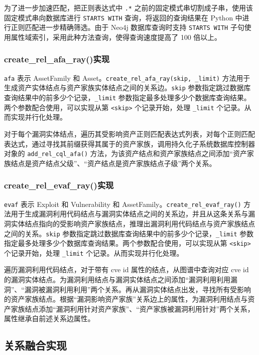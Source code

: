 \documentclass[a4paper,AutoFakeBold,oneside,12pt]{book}
\begin{document}
为了进一步加速匹配，把正则表达式中 \lstinline|.*| 之前的固定模式串切割成子串，使用该固定模式串向数据库进行 \lstinline|STARTS WITH| 查询，将返回的查询结果在 Python 中进行正则匹配进一步精确筛选。由于 Neo4j 数据库查询时支持 \lstinline|STARTS WITH| 子句使用属性域索引，采用此种方法查询，使得查询速度提高了 100 倍以上。

\subsubsection{create{\_}rel{\_}afa{\_}ray()实现}

\lstinline|afa| 表示 AssetFamily 和 Asset。\lstinline|create_rel_afa_ray(skip, _limit)| 方法用于生成资产实体结点与资产家族实体结点之间的关系边。\lstinline|skip| 参数指定跳过数据库查询结果中的前多少个记录，\lstinline|_limit| 参数指定最多处理多少个数据库查询结果。两个参数配合使用，可以实现从第 \lstinline|<skip>| 个记录开始，处理 \lstinline|_limit| 个记录。从而实现并行化处理。

对于每个漏洞实体结点，遍历其受影响资产正则匹配表达式列表，对每个正则匹配表达式，通过寻找其前缀获得其属于的资产家族，调用持久化子系统数据库控制器对象的 \lstinline|add_rel_cql_afa()| 方法，为该资产结点和资产家族结点之间添加“资产家族结点是资产结点父级”、“资产结点是资产家族结点子级”两个关系。

\subsubsection{create{\_}rel{\_}evaf{\_}ray()实现}

\lstinline|evaf| 表示 Exploit 和 Vulnerability 和 AssetFamily。\lstinline|create_rel_evaf_ray()| 方法用于生成漏洞利用代码结点与漏洞实体结点之间的关系边，并且从这条关系与漏洞实体结点指向的受影响资产家族结点，推理出漏洞利用代码结点与资产家族结点之间的关系。\lstinline|skip| 参数指定跳过数据库查询结果中的前多少个记录，\lstinline|_limit| 参数指定最多处理多少个数据库查询结果。两个参数配合使用，可以实现从第 \lstinline|<skip>| 个记录开始，处理 \lstinline|_limit| 个记录。从而实现并行化处理。

遍历漏洞利用代码结点，对于带有 cve id 属性的结点，从图谱中查询对应 cve id 的漏洞实体结点。为漏洞利用结点与漏洞实体结点之间添加“漏洞利用利用漏洞”、“漏洞被漏洞利用利用”两个关系。再从漏洞实体结点出发，寻找所有受影响的资产家族结点。根据“漏洞影响资产家族”关系边上的属性，为漏洞利用结点与资产家族结点添加“漏洞利用针对资产家族”、“资产家族被漏洞利用针对”两个关系，属性继承自前述关系边属性。

\subsection{关系融合实现}
\end{document}
